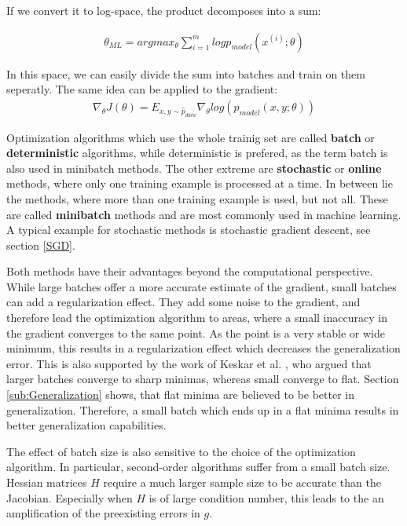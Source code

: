 If we convert it to log-space, the product decomposes into a sum:

\begin{align}
    \theta_{ML} = argmax_{\theta} \sum_{i=1}^m log p_{model}(x^{(i)}; \theta)
\end{align}

In this space, we can easily divide the sum into batches and train on them
seperatly. The same idea can be applied to the gradient:
\begin{align}
    \nabla_\theta J(\theta)=E_{x,y\sim \hat{p}_{data}} \nabla_\theta log(p_{model}(x,y;\theta))
\end{align}

Optimization algorithms which use the whole trainig set are called
\textbf{batch} or \textbf{deterministic} algorithms, while deterministic is
prefered, as the term batch is also used in minibatch methods. The other extreme
are \textbf{stochastic} or \textbf{online} methods, where only one training
example is processed at a time. In between lie the methods, where more than one
training example is used, but not all. These are called \textbf{minibatch}
methods and are most commonly used in machine learning. A typical example for
stochastic methods is stochastic gradient descent, see section \ref{SGD}.


Both methods have their advantages beyond the computational perspective. While
large batches offer a more accurate estimate of the gradient, small batches can
add a regularization effect. They add some noise to the gradient, and therefore
lead the optimization algorithm to areas, where a small inaccuracy in the
gradient converges to the same point. As the point is a very stable or wide
minimum, this results in a regularization effect which decreases the
generalization error. This is also supported by the work of Keskar et al.
\cite{keskar2016large}, who argued that larger batches converge to sharp
minimas, whereas small converge to flat. Section \ref{sub:Generalization} shows,
that flat minima are believed to be better in generalization. Therefore, a small
batch which ends up in a flat minima results in better generalization
capabilities.


The effect of batch size is also sensitive to the choice of the optimization
algorithm. In particular, second-order algorithms suffer from a small batch
size. Hessian matrices $H$ require a much larger sample size to be accurate than
the Jacobian. Especially when $H$ is of large condition number, this leads to the
an amplification of the preexisting errors in $g$.

